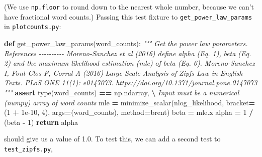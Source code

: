 \documentclass[
]{krantz}
\makeatletter
\newenvironment{Shaded}{\begin{snugshade}}{\end{snugshade}}
\newcommand{\BuiltInTok}[1]{#1}
\newcommand{\CommentTok}[1]{\textcolor[rgb]{0.56,0.35,0.01}{\textit{#1}}}
\newcommand{\ControlFlowTok}[1]{\textcolor[rgb]{0.13,0.29,0.53}{\textbf{#1}}}
\newcommand{\DecValTok}[1]{\textcolor[rgb]{0.00,0.00,0.81}{#1}}
\newcommand{\FloatTok}[1]{\textcolor[rgb]{0.00,0.00,0.81}{#1}}
\newcommand{\KeywordTok}[1]{\textcolor[rgb]{0.13,0.29,0.53}{\textbf{#1}}}
\newcommand{\NormalTok}[1]{#1}
\newcommand{\OperatorTok}[1]{\textcolor[rgb]{0.81,0.36,0.00}{\textbf{#1}}}
\newcommand{\StringTok}[1]{\textcolor[rgb]{0.31,0.60,0.02}{#1}}
\newenvironment{kframe}{%
\medskip{}
\setlength{\fboxsep}{.8em}
 \def\at@end@of@kframe{}%
 \ifinner\ifhmode%
  \def\at@end@of@kframe{\end{minipage}}%
  \begin{minipage}{\columnwidth}%
 \fi\fi%
 \def\FrameCommand##1{\hskip\@totalleftmargin \hskip-\fboxsep
 \colorbox{shadecolor}{##1}\hskip-\fboxsep
     \hskip-\linewidth \hskip-\@totalleftmargin \hskip\columnwidth}%
 \MakeFramed {\advance\hsize-\width
   \@totalleftmargin\z@ \linewidth\hsize
   \@setminipage}}%
 {\par\unskip\endMakeFramed%
 \at@end@of@kframe}
\renewenvironment{Shaded}{\begin{kframe}}{\end{kframe}}
\makeatother
\begin{document}
(We use \texttt{np.floor} to round down to the nearest whole number,
because we can't have fractional word counts.)
Passing this test fixture to \texttt{get\_power\_law\_params} in \texttt{plotcounts.py}:

\begin{Shaded}
\begin{Highlighting}[]
\KeywordTok{def}\NormalTok{ get\_power\_law\_params(word\_counts):}
    \CommentTok{"""}
\CommentTok{    Get the power law parameters.}
\CommentTok{    References}
\CommentTok{    {-}{-}{-}{-}{-}{-}{-}{-}{-}{-}}
\CommentTok{    Moreno{-}Sanchez et al (2016) define alpha (Eq. 1),}
\CommentTok{      beta (Eq. 2) and the maximum likelihood estimation (mle)}
\CommentTok{      of beta (Eq. 6).}
\CommentTok{    Moreno{-}Sanchez I, Font{-}Clos F, Corral A (2016)}
\CommentTok{      Large{-}Scale Analysis of Zipf\textquotesingle{}s Law in English Texts.}
\CommentTok{      PLoS ONE 11(1): e0147073.}
\CommentTok{      https://doi.org/10.1371/journal.pone.0147073}
\CommentTok{    """}
    \ControlFlowTok{assert} \BuiltInTok{type}\NormalTok{(word\_counts) }\OperatorTok{==}\NormalTok{ np.ndarray, }\OperatorTok{\textbackslash{}}
           \CommentTok{\textquotesingle{}Input must be a numerical (numpy) array of word counts\textquotesingle{}}
\NormalTok{    mle }\OperatorTok{=}\NormalTok{ minimize\_scalar(nlog\_likelihood, bracket}\OperatorTok{=}\NormalTok{(}\DecValTok{1} \OperatorTok{+} \FloatTok{1e{-}10}\NormalTok{, }\DecValTok{4}\NormalTok{),}
\NormalTok{                          args}\OperatorTok{=}\NormalTok{(word\_counts), method}\OperatorTok{=}\StringTok{\textquotesingle{}brent\textquotesingle{}}\NormalTok{)}
\NormalTok{    beta }\OperatorTok{=}\NormalTok{ mle.x}
\NormalTok{    alpha }\OperatorTok{=} \DecValTok{1} \OperatorTok{/}\NormalTok{ (beta }\OperatorTok{{-}} \DecValTok{1}\NormalTok{)}
    \ControlFlowTok{return}\NormalTok{ alpha}
\end{Highlighting}
\end{Shaded}

should give us a value of 1.0.
To test this, we can add a second test to \texttt{test\_zipfs.py},
\end{document}
